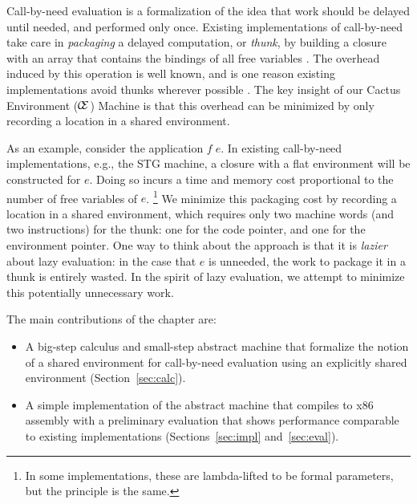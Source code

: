 Call-by-need evaluation is a formalization of the idea that work
should be delayed until needed, and performed only once.  Existing
implementations of call-by-need take care in \emph{packaging} a delayed
computation, or \emph{thunk}, by building a closure with an array that contains
the bindings of all free variables \cite{jonesstg,boquist1997grin}. The overhead
induced by this operation is well known, and is one reason existing implementations
avoid thunks wherever possible \cite{johnsson1984efficient}. The key insight of
our Cactus Environment ($\mathcal{\mathcal{C} \mskip -4mu \mathcal{E}}$) Machine is that this overhead can be
minimized by only recording a location in a shared environment.

As an example, consider the application $f \; e$. In existing call-by-need
implementations, e.g., the STG machine\cite{jonesstg}, a closure with a flat
environment will be constructed for $e$.  Doing so incurs a time and memory cost
proportional to the number of free variables of $e$. \footnote{In some
implementations, these are lambda-lifted to be formal parameters, but the
principle is the same.} We minimize this packaging cost by recording a
location in a shared environment, which requires only two
machine words (and two instructions) for the thunk: one for the code pointer,
and one for the environment pointer. One way to think about the approach is that
it is \emph{lazier} about lazy evaluation: in the case that $e$ is unneeded, the
work to package it in a thunk is entirely wasted. In the spirit of lazy
evaluation, we attempt to minimize this potentially unnecessary work.  

The main contributions of the chapter are:
\begin{itemize}
\item A big-step calculus and small-step abstract machine that formalize the
notion of a shared environment for call-by-need evaluation using an explicitly
shared environment (Section~\ref{sec:calc}).
\item A simple implementation of the abstract machine that compiles to x86
assembly with a preliminary evaluation that shows performance comparable to
existing implementations (Sections~\ref{sec:impl} and~\ref{sec:eval}).
\end{itemize}

